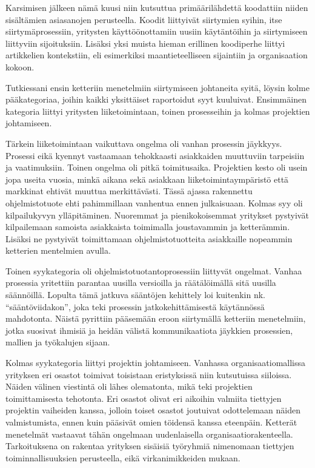 \documentclass[12pt]{article}
\begin{document}
Karsimisen jälkeen nämä kuusi niin kutsuttua primäärilähdettä koodattiin
niiden sisältämien asiasanojen perusteella. Koodit liittyivät siirtymien
syihin, itse siirtymäprosessiin, yritysten käyttöönottamiin uusiin
käytäntöihin ja siirtymiseen liittyviin sijoituksiin. Lisäksi yksi
muista hieman erillinen koodiperhe liittyi artikkelien kontekstiin, eli
esimerkiksi maantieteelliseen sijaintiin ja organisaation kokoon.

Tutkiessani ensin ketteriin menetelmiin siirtymiseen johtaneita syitä,
löysin kolme pääkategoriaa, joihin kaikki yksittäiset raportoidut syyt
kuuluivat. Ensimmäinen kategoria liittyi yritysten liiketoimintaan,
toinen prosesseihin ja kolmas projektien johtamiseen.

Tärkein liiketoimintaan vaikuttava ongelma oli vanhan prosessin
jäykkyys. Prosessi eikä kyennyt vastaamaan tehokkaasti asiakkaiden
muuttuviin tarpeisiin ja vaatimuksiin. Toinen ongelma oli pitkä
toimitusaika. Projektien kesto oli usein jopa useita vuosia, minkä
aikana sekä asiakkaan liiketoimintaympäristö että markkinat ehtivät
muuttua merkittävästi. Tässä ajassa rakennettu ohjelmistotuote ehti
pahimmillaan vanhentua ennen julkaisuaan. Kolmas syy oli kilpailukyvyn
ylläpitäminen. Nuoremmat ja pienikokoisemmat yritykset pystyivät
kilpailemaan samoista asiakkaista toimimalla joustavammin ja
ketterämmin. Lisäksi ne pystyivät toimittamaan ohjelmistotuotteita
asiakkaille nopeammin ketterien mentelmien avulla.

Toinen syykategoria oli ohjelmistotuotantoprosessiin liittyvät ongelmat.
Vanhaa prosessia yritettiin parantaa uusilla versioilla ja räätälöimällä
sitä uusilla säännöillä. Lopulta tämä jatkuva sääntöjen kehittely loi
kuitenkin nk. ``sääntöviidakon'', joka teki prosessin
jatkokehittämisestä käytännössä mahdotonta. Näistä pyrittiin pääsemään
eroon siirtymällä ketteriin menetelmiin, jotka suosivat ihmisiä ja
heidän välistä kommunikaatiota jäykkien prosessien, mallien ja
työkalujen sijaan.

Kolmas syykategoria liittyi projektin johtamiseen. Vanhassa
organisaatiomallissa yrityksen eri osastot toimivat toisistaan
eristyksissä niin kutsutuissa siiloissa. Näiden välinen viestintä oli
lähes olematonta, mikä teki projektien toimittamisesta tehotonta. Eri
osastot olivat eri aikoihin valmiita tiettyjen projektin vaiheiden
kanssa, jolloin toiset osastot joutuivat odottelemaan näiden
valmistumista, ennen kuin pääsivät omien töidensä kanssa eteenpäin.
Ketterät menetelmät vastaavat tähän ongelmaan uudenlaisella
organisaatiorakenteella. Tarkoituksena on rakentaa yrityksen sisäisiä
työryhmiä nimenomaan tiettyjen toiminnallisuuksien perusteella, eikä
virkanimikkeiden mukaan.
\end{document}
